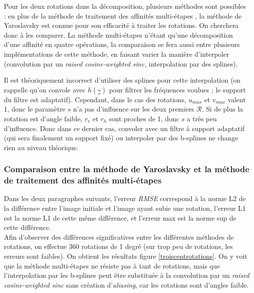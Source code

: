 
Pour les deux rotations dans la décomposition, plusieurs méthodes sont possibles : en plus de la méthode de traitement des affinités multi-étapes \cite{szeliski2010high}, la méthode de Yaroslavsky \cite{unser1995convolution} est connue pour son efficacité à traiter les rotations. On cherchera donc à les comparer. La méthode multi-étapes n'étant qu'une décomposition d'une affinité en quatre opérations, la comparaison se fera aussi entre plusieurs implémentations de cette méthode, en faisant varier la manière d'interpoler (convolution par un \emph{raised cosine-weighted sinc}, interpolation par des splines).

Il est théoriquement incorrect d'utiliser des splines pour cette interpolation (on rappelle qu'on convole avec $h(\frac{\dot{}}{s})$ pour filtrer les fréquences voulues ; le support du filtre est adaptatif). Cependant, dans le cas des rotations, $u_{max}$ et $v_{max}$ valent 1, donc le paramètre $s$ n'a pas d'influence sur les deux premiers $\mathcal R$. Si de plus la rotation est d'angle faible, $r_v$ et $r_h$ sont proches de 1, donc $s$ a très peu d'influence. Donc dans ce dernier cas, convoler avec un filtre à support adaptatif (qui sera finalement un support fixé) ou interpoler par des b-splines ne change rien au niveau théorique.


\subsubsection*{Comparaison entre la méthode de Yaroslavsky et la méthode de traitement des affinités multi-étapes}

	Dans les deux paragraphes suivants, l'erreur \emph{RMSE} correspond à la norme L2 de la différence entre l'image initiale et l'image ayant subie une rotation, l'erreur L1 est la norme L1 de cette même différence, et l'erreur max est la norme sup de cette différence.\\

	Afin d'observer des différences significatives entre les différentes méthodes de rotations, on effectue 360 rotations de 1 degré (sur trop peu de rotations, les erreurs sont faibles). On obtient les résultats figure \ref{troiscentrotations}. On y voit que la méthode multi-étapes ne résiste pas à tant de rotations, mais que l'interpolation par les b-splines peut être substituée à la convolution par un \emph{raised cosine-weighted sinc} sans création d'\emph{aliasing}, car les rotations sont d'angles faible.
\label{pleinsderotations}
	
